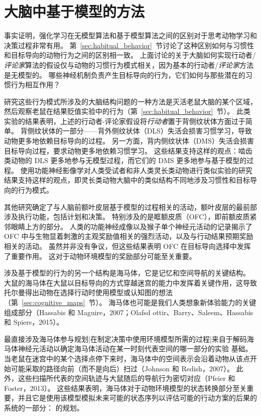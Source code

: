 \section{大脑中基于模型的方法}

事实证明，强化学习在无模型算法和基于模型算法之间的区别对于思考动物学习和决策过程非常有用。
第~\ref{sec:habitual_behavior}~节讨论了这种区别如何与习惯性和目标导向的动物行为之间的区别相一致。
上面讨论的关于大脑如何实现行动者/\textit{评论家}算法的假设仅与动物的习惯行为模式相关，因为基本的行动者/\textit{评论家}方法是无模型的。
哪些神经机制负责产生目标导向的行为，它们如何与那些潜在的习惯行为相互作用？


研究这些行为模式所涉及的大脑结构问题的一种方法是灭活老鼠大脑的某个区域，然后观察老鼠在结果贬值实验中的行为（第~\ref{sec:habitual_behavior}~节）。
此类实验的结果表明，上述的行动者-评论家假设将\textit{行动者}置于背侧纹状体方面过于简单。
背侧纹状体的一部分——背外侧纹状体（DLS）失活会损害习惯学习，导致动物更多地依赖目标导向的过程。
另一方面，背内侧纹状体（DMS）失活会损害目标导向过程，要求动物更多地依赖习惯学习。
这些结果支持这样的观点：啮齿类动物的 DLS 更多地参与无模型过程，而它们的 DMS 更多地参与基于模型的过程。
使用功能神经影像学对人类受试者和非人类灵长类动物进行类似实验的研究结果支持这样的观点，即灵长类动物大脑中的类似结构不同地涉及习惯性和目标导向的行为模式。


其他研究确定了与人脑前额叶皮层基于模型的过程相关的活动，额叶皮层的最前部涉及执行功能，包括计划和决策。
特别涉及的是眶额皮质（OFC），即前额皮质紧邻眼睛上方的部分。
人类的功能神经成像以及猴子单个神经元活动的记录揭示了 OFC 中与生物显着刺激的主观奖励值相关的强烈活动，以及与行动结果预期奖励相关的活动。
虽然并非没有争议，但这些结果表明 OFC 在目标导向选择中发挥了重要作用。
这对于动物环境模型的奖励部分可能至关重要。


涉及基于模型的行为的另一个结构是海马体，它是记忆和空间导航的关键结构。
大鼠的海马体在大鼠以目标导向的方式穿越迷宫的能力中发挥着关键作用，这导致托尔曼得出动物在选择行动时使用模型或认知图的想法（第~\ref{sec:cognitive_maps}~节）。
海马体也可能是我们人类想象新体验能力的关键组成部分（Hassabis 和 Maguire，2007；Olafsd ottir、Barry、Saleem、Hassabis 和 Spiers，2015）。


最直接涉及海马体参与规划|在制定决策中使用环境模型所需的过程|来自于解码海马体神经元活动以确定海马体活动在某一时刻代表空间的哪一部分的实验 基础。
当老鼠在迷宫中的某个选择点停下来时，海马体中的空间表示会沿着动物从该点开始可能采取的路径向前（而不是向后）扫过（Johnson 和 Redish，2007）。
此外，这些扫描所代表的空间轨迹与大鼠随后的导航行为密切对应（Pfeier 和 Foster，2013）。
这些结果表明，海马体对于动物环境模型的状态转换部分至关重要，并且它是使用该模型模拟未来可能的状态序列以评估可能的行动方案的后果的系统的一部分： 的规划。


